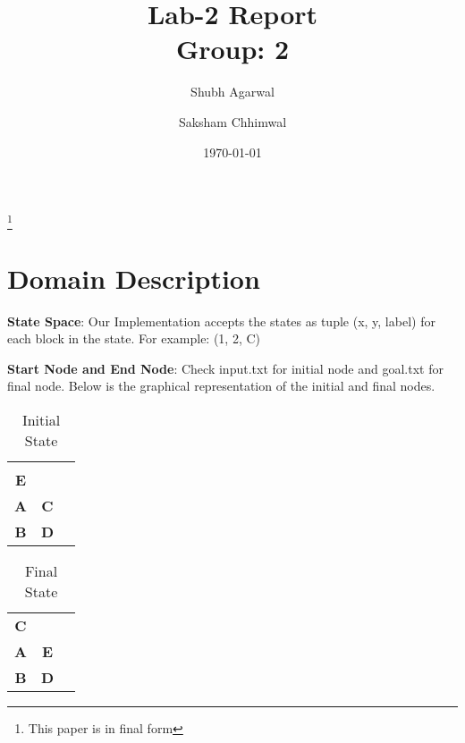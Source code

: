 \documentclass[a4paper,10pt,reqno,oneside]{amsart}
\begin{document}
\title[Block World Domain (Greedy Approach)]{Lab-2 Report\\Group: 2}
\author{Shubh Agarwal}
%

\author{Saksham Chhimwal}
%
\thanks{This paper is in final form}
\date{\today}

\maketitle

\section{Domain Description}

\textbf{State Space}: Our Implementation accepts the states as tuple (x, y, label) for each block in the state. 
For example: (1, 2, C)

\textbf{Start Node and End Node}: Check input.txt for initial node and goal.txt for final node. Below 
is the graphical representation of the initial and final nodes.

\begin{table}[h]
    \begin{tabular}{ccc}
    \textbf{}  & \textbf{}  & \textbf{}  \\
    \textbf{E} & \textbf{}  & \textbf{}  \\
    \textbf{A} & \textbf{C} & \textbf{}  \\
    \textbf{B} & \textbf{D} & \textbf{}
    \end{tabular}
    \caption{Initial State}
\end{table}

\begin{table}[h]
    \begin{tabular}{ccc}
    \textbf{C} & \textbf{} & \textbf{} \\
    \textbf{A} & \textbf{E} & \textbf{} \\
    \textbf{B} & \textbf{D} & \textbf{}
    \end{tabular}
    \caption{Final State}
\end{table}
\end{document}
